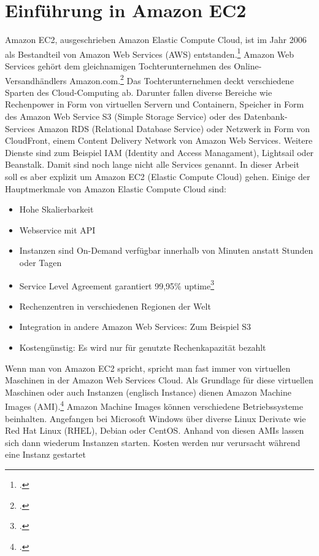 \documentclass[titlepage]{report}
\begin{document}
\section*{Einführung in Amazon EC2}
Amazon EC2, ausgeschrieben Amazon Elastic Compute Cloud, ist im Jahr
2006 als Bestandteil von Amazon Web Services (AWS)
entstanden.\footcite{aws} Amazon Web Services gehört dem gleichnamigen
Tochterunternehmen des Online\hyp{}Versandhändlers Amazon.com.\footcite{Fou}
Das Tochterunternehmen deckt verschiedene Sparten des Cloud\hyp{}Computing
ab. Darunter fallen diverse Bereiche wie Rechenpower in Form von
virtuellen Servern und Containern, Speicher in Form des Amazon Web
Service S3 (Simple Storage Service) oder des Datenbank\hyp{}Services Amazon
RDS (Relational Database Service) oder Netzwerk in Form von CloudFront,
einem Content Delivery Network von Amazon Web Services. Weitere Dienste
sind zum Beispiel IAM (Identity and Access Managament), Lightsail oder Beanstalk.
Damit sind noch lange nicht alle Services genannt. In dieser Arbeit soll
es aber explizit um Amazon EC2 (Elastic Compute Cloud) gehen. Einige der
Hauptmerkmale von Amazon Elastic Compute Cloud sind:
\begin{itemize}
    \item Hohe Skalierbarkeit
    \item Webservice mit API
    \item Instanzen sind On\hyp{}Demand verfügbar innerhalb von Minuten anstatt
      Stunden oder Tagen
    \item Service Level Agreement garantiert 99,95\% uptime\footcite{ec2}
    \item Rechenzentren in verschiedenen Regionen der Welt
    \item Integration in andere Amazon Web Services: Zum Beispiel S3
    \item Kostengünstig: Es wird nur für genutzte Rechenkapazität bezahlt
\end{itemize}
Wenn man von Amazon EC2 spricht, spricht man fast immer von virtuellen
Maschinen in der Amazon Web Services Cloud. Als Grundlage für diese
virtuellen Maschinen oder auch Instanzen (englisch Instance) dienen
Amazon Machine Images (AMI).\footcite{ec2details} Amazon Machine Images
können verschiedene Betriebssysteme beinhalten. Angefangen bei Microsoft
Windows über diverse Linux Derivate wie Red Hat Linux (RHEL), Debian
oder CentOS. Anhand von diesen AMIs lassen sich dann wiederum Instanzen
starten. Kosten werden nur verursacht während eine Instanz gestartet
\end{document}
